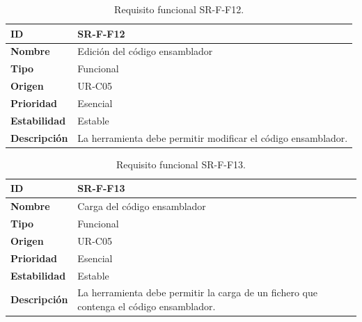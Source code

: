 \begin{center}
\begin{table}[htbp]
\centering
\caption{Requisito funcional SR-F-F12.}
\begin{tabular}{@{}p{2.5cm} p{9cm}@{}} 
\toprule
\textbf{ID} 				& SR-F-F12 \\
\midrule
\textbf{Nombre} 			& Edición del código ensamblador\\
\midrule
\textbf{Tipo} 			& Funcional \\
\midrule
\textbf{Origen} 			& UR-C05 \\
\midrule
\textbf{Prioridad}		& Esencial \\
\midrule
\textbf{Estabilidad} 		& Estable \\
\midrule
\textbf{Descripción} 	& La herramienta debe permitir modificar el código ensamblador. \\
\bottomrule
\end{tabular}
\label{tab:srff12}
\end{table}
\end{center}

\begin{center}
\begin{table}[htbp]
\centering
\caption{Requisito funcional SR-F-F13.}
\begin{tabular}{@{}p{2.5cm} p{9cm}@{}} 
\toprule
\textbf{ID} 				& SR-F-F13 \\
\midrule
\textbf{Nombre} 			& Carga del código ensamblador\\
\midrule
\textbf{Tipo} 			& Funcional \\
\midrule
\textbf{Origen} 			& UR-C05 \\
\midrule
\textbf{Prioridad}		& Esencial \\
\midrule
\textbf{Estabilidad} 		& Estable \\
\midrule
\textbf{Descripción} 	& La herramienta debe permitir la carga de un fichero que contenga el código ensamblador. \\
\bottomrule
\end{tabular}
\label{tab:srff13}
\end{table}
\end{center}

